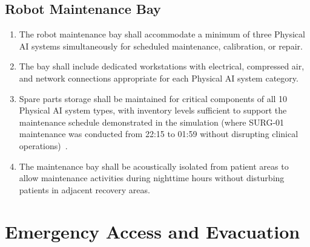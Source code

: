 \subsection{Robot Maintenance Bay}

\begin{enumerate}[label=(\alph*)]
\item The robot maintenance bay shall accommodate a minimum of three Physical
  AI systems simultaneously for scheduled maintenance, calibration, or repair.

\item The bay shall include dedicated workstations with electrical, compressed
  air, and network connections appropriate for each Physical AI system
  category.

\item Spare parts storage shall be maintained for critical components of all
  10 Physical AI system types, with inventory levels sufficient to support
  the maintenance schedule demonstrated in the simulation (where SURG-01
  maintenance was conducted from 22:15 to 01:59 without disrupting clinical
  operations)~\cite{newtrial2026}.

\item The maintenance bay shall be acoustically isolated from patient areas to
  allow maintenance activities during nighttime hours without disturbing
  patients in adjacent recovery areas.
\end{enumerate}

\section{Emergency Access and Evacuation}

